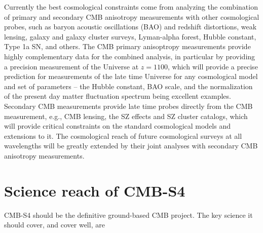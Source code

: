 Currently the best cosmological constraints come from analyzing the combination of primary and secondary CMB anisotropy measurements with other cosmological probes, such as baryon acoustic oscillations (BAO) and redshift distortions, weak lensing, galaxy and galaxy cluster surveys, Lyman-alpha forest, Hubble constant, Type 1a SN, and others. The CMB primary anisoptropy measurements provide highly complementary data for the combined analysis, in particular by providing a precision measurement of the Universe at $z = 1100$, which will provide a precise prediction for measurements of the late time Universe for any cosmological model and set of parameters -- the Hubble constant, BAO scale, and the normalization of the present day matter fluctuation spectrum being excellent examples. Secondary CMB measurements provide late time probes directly from the CMB measurement, e.g., CMB lensing, the SZ effects and SZ cluster catalogs, which will provide critical constraints on the standard cosmological models and extensions to it. The cosmological reach of future cosmological surveys at all wavelengths will be greatly extended by their joint analyses with secondary CMB anisotropy measurements. 


\section{Science reach of CMB-S4}
\label{sec:science}

CMB-S4 should be the definitive ground-based CMB project. The key science it should cover, and cover well, are

